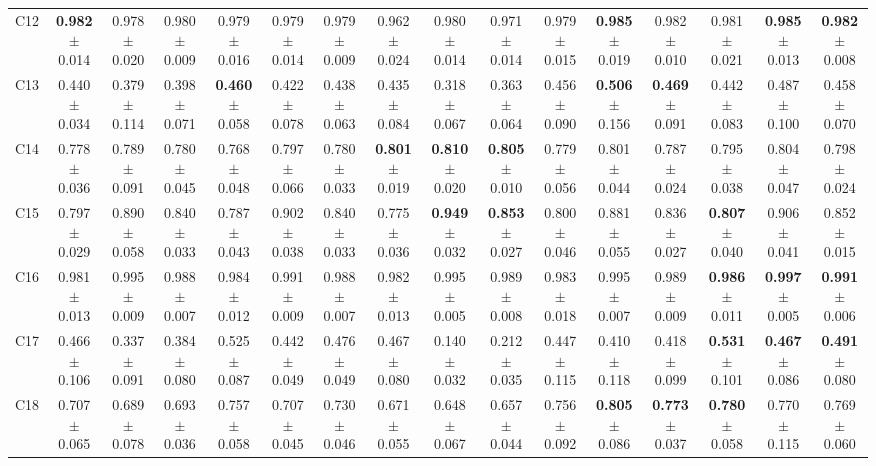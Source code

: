 \documentclass[11pt]{article}
\begin{document}
\begin{table}
{\begin{tabular}{lccccccccccccccc}
C12 & \textbf{0.982} $\pm$ 0.014 & 0.978 $\pm$ 0.020 & 0.980 $\pm$ 0.009 & 0.979 $\pm$ 0.016 & 0.979 $\pm$ 0.014 & 0.979 $\pm$ 0.009 & 0.962 $\pm$ 0.024 & 0.980 $\pm$ 0.014 & 0.971 $\pm$ 0.014 & 0.979 $\pm$ 0.015 & \textbf{0.985} $\pm$ 0.019 & 0.982 $\pm$ 0.010 & 0.981 $\pm$ 0.021 & \textbf{0.985} $\pm$ 0.013 & \textbf{0.982} $\pm$ 0.008 \\
C13 & 0.440 $\pm$ 0.034 & 0.379 $\pm$ 0.114 & 0.398 $\pm$ 0.071 & \textbf{0.460} $\pm$ 0.058 & 0.422 $\pm$ 0.078 & 0.438 $\pm$ 0.063 & 0.435 $\pm$ 0.084 & 0.318 $\pm$ 0.067 & 0.363 $\pm$ 0.064 & 0.456 $\pm$ 0.090 & \textbf{0.506} $\pm$ 0.156 & \textbf{0.469} $\pm$ 0.091 & 0.442 $\pm$ 0.083 & 0.487 $\pm$ 0.100 & 0.458 $\pm$ 0.070 \\
C14 & 0.778 $\pm$ 0.036 & 0.789 $\pm$ 0.091 & 0.780 $\pm$ 0.045 & 0.768 $\pm$ 0.048 & 0.797 $\pm$ 0.066 & 0.780 $\pm$ 0.033 & \textbf{0.801} $\pm$ 0.019 & \textbf{0.810} $\pm$ 0.020 & \textbf{0.805} $\pm$ 0.010 & 0.779 $\pm$ 0.056 & 0.801 $\pm$ 0.044 & 0.787 $\pm$ 0.024 & 0.795 $\pm$ 0.038 & 0.804 $\pm$ 0.047 & 0.798 $\pm$ 0.024 \\
C15 & 0.797 $\pm$ 0.029 & 0.890 $\pm$ 0.058 & 0.840 $\pm$ 0.033 & 0.787 $\pm$ 0.043 & 0.902 $\pm$ 0.038 & 0.840 $\pm$ 0.033 & 0.775 $\pm$ 0.036 & \textbf{0.949} $\pm$ 0.032 & \textbf{0.853} $\pm$ 0.027 & 0.800 $\pm$ 0.046 & 0.881 $\pm$ 0.055 & 0.836 $\pm$ 0.027 & \textbf{0.807} $\pm$ 0.040 & 0.906 $\pm$ 0.041 & 0.852 $\pm$ 0.015 \\
C16 & 0.981 $\pm$ 0.013 & 0.995 $\pm$ 0.009 & 0.988 $\pm$ 0.007 & 0.984 $\pm$ 0.012 & 0.991 $\pm$ 0.009 & 0.988 $\pm$ 0.007 & 0.982 $\pm$ 0.013 & 0.995 $\pm$ 0.005 & 0.989 $\pm$ 0.008 & 0.983 $\pm$ 0.018 & 0.995 $\pm$ 0.007 & 0.989 $\pm$ 0.009 & \textbf{0.986} $\pm$ 0.011 & \textbf{0.997} $\pm$ 0.005 & \textbf{0.991} $\pm$ 0.006 \\
C17 & 0.466 $\pm$ 0.106 & 0.337 $\pm$ 0.091 & 0.384 $\pm$ 0.080 & 0.525 $\pm$ 0.087 & 0.442 $\pm$ 0.049 & 0.476 $\pm$ 0.049 & 0.467 $\pm$ 0.080 & 0.140 $\pm$ 0.032 & 0.212 $\pm$ 0.035 & 0.447 $\pm$ 0.115 & 0.410 $\pm$ 0.118 & 0.418 $\pm$ 0.099 & \textbf{0.531} $\pm$ 0.101 & \textbf{0.467} $\pm$ 0.086 & \textbf{0.491} $\pm$ 0.080 \\
C18 & 0.707 $\pm$ 0.065 & 0.689 $\pm$ 0.078 & 0.693 $\pm$ 0.036 & 0.757 $\pm$ 0.058 & 0.707 $\pm$ 0.045 & 0.730 $\pm$ 0.046 & 0.671 $\pm$ 0.055 & 0.648 $\pm$ 0.067 & 0.657 $\pm$ 0.044 & 0.756 $\pm$ 0.092 & \textbf{0.805} $\pm$ 0.086 & \textbf{0.773} $\pm$ 0.037 & \textbf{0.780} $\pm$ 0.058 & 0.770 $\pm$ 0.115 & 0.769 $\pm$ 0.060 \\

\end{tabular}}
\end{table}
\end{document}
